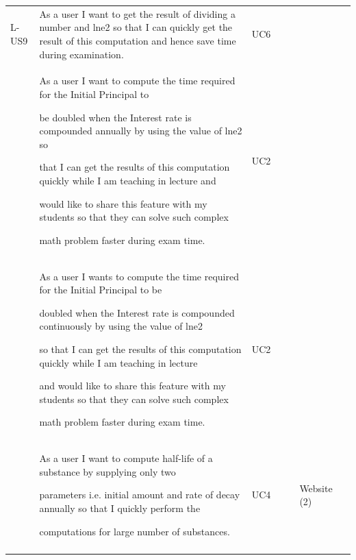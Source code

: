 \documentclass[12pt]{article}
\begin{document}
{\begin{longtable}{p{0.56in}p{0.65in}p{1.19in}p{0.53in}p{0.46in}p{0.64in}p{0.99in}}
\multicolumn{1}{|p{0.65in}}{L-US9} & 
\multicolumn{1}{|p{1.19in}}{As a user I want to get the result of dividing a number and lne2 so that I
can quickly get the result of this computation and hence save time during examination.} & 
\multicolumn{1}{|p{0.53in}}{UC6} & 
\multicolumn{1}{|p{0.46in}}{} & 
\multicolumn{1}{|p{0.64in}}{} & 
\multicolumn{1}{|p{0.99in}|}{} \\
\hhline{-------}

\multicolumn{1}{|p{0.65in}}{L-US10} & 
\multicolumn{1}{|p{1.19in}}{As a user I want to compute the time required for the Initial Principal to \par be doubled when the Interest rate is compounded annually by using the value of lne2 so \par that I can get the results of this computation quickly while I am teaching in lecture and \par would like to share this feature with my students so that they can solve such complex \par math problem faster during exam time.} & 
\multicolumn{1}{|p{0.53in}}{UC2} & 
\multicolumn{1}{|p{0.46in}}{} & 
\multicolumn{1}{|p{0.64in}}{} & 
\multicolumn{1}{|p{0.99in}|}{} \\
\hhline{-------}

\multicolumn{1}{|p{0.65in}}{L-US11} & 
\multicolumn{1}{|p{1.19in}}{As a user I wants to compute the time required for the Initial Principal to be \par doubled when the Interest rate is compounded continuously by using the value of lne2 \par so that I can get the results of this computation quickly while I am teaching in lecture \par and would like to share this feature with my students so that they can solve such complex \par math problem faster during exam time.} & 
\multicolumn{1}{|p{0.53in}}{UC2} & 
\multicolumn{1}{|p{0.46in}}{} & 
\multicolumn{1}{|p{0.64in}}{} & 
\multicolumn{1}{|p{0.99in}|}{} \\
\hhline{-------}
 
\multicolumn{1}{|p{0.65in}}{L-US12} & 
\multicolumn{1}{|p{1.19in}}{As a user I want to compute half-life of a substance by supplying only two \par parameters i.e. initial amount and rate of decay annually so that I quickly perform the \par computations for large number of substances.} & 
\multicolumn{1}{|p{0.53in}}{UC4} & 
\multicolumn{1}{|p{0.46in}}{} & 
\multicolumn{1}{|p{0.64in}}{} & 
\multicolumn{1}{|p{0.99in}|}{Website (2)} \\
\hhline{-------}

\end{longtable}}
\end{document}
